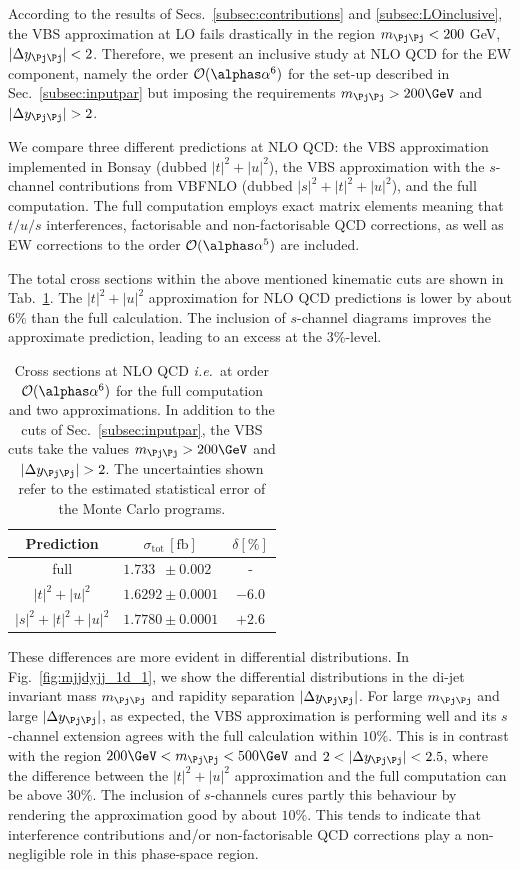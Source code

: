 According to the results of Secs.~\ref{subsec:contributions} and \ref{subsec:LOinclusive}, the VBS approximation at LO fails drastically in the region $m_{\Pj\Pj} < 200$ GeV, $|\Delta y_{\Pj\Pj}| < 2$.
Therefore, we present an inclusive study at NLO QCD for the EW component, namely the order $\mathcal{O}(\alphas\alpha^6)$ for the set-up described in Sec.~\ref{subsec:inputpar} but imposing the requirements $m_{\Pj\Pj}>200 \GeV$ and $|\Delta y_{\Pj\Pj}|>2$.

We compare three different predictions at NLO QCD: 
the VBS approximation implemented in {\sc Bonsay} (dubbed $|t|^2+|u|^2$), the VBS approximation with the $s$-channel contributions from {\sc VBFNLO} (dubbed $|s|^2+|t|^2+|u|^2$), and the full computation.
The full computation employs exact matrix elements meaning that $t/u/s$ interferences, factorisable and non-factorisable QCD corrections, as well as EW corrections to the order $\mathcal{O}(\alphas \alpha^5)$ are included.

The total cross sections within the above mentioned kinematic cuts are shown in Tab.~\ref{tab:crosssecINCLUSIVE}.
The $|t|^2+|u|^2$ approximation for NLO QCD predictions is lower by about $6\%$ than the full calculation.
The inclusion of $s$-channel diagrams improves the approximate prediction, leading to an excess at the $3\%$-level.

\begin{table}[h!]
\centering
\begin{tabular}{c|c|c}
Prediction & $\sigma_{\textrm{tot}}\,[\textrm{fb}]$ & $\delta [\%]$ \\
\hline
\hline
full &  $1.733\phantom{0} \pm 0.002\phantom{0}$ & - \\
\hline
$|t|^2 + |u|^2$ & $1.6292 \pm 0.0001$  &  $-6.0$ \\
\hline
$|s|^2 + |t|^2 + |u|^2$ & $1.7780 \pm 0.0001$  & $+2.6$
\end{tabular}
\caption{Cross sections at NLO QCD \emph{i.e.}\ at order $\mathcal{O}(\alphas\alpha^6)$ for the full computation and two approximations.
In addition to the cuts of Sec.~\ref{subsec:inputpar}, the VBS cuts take the values $m_{\Pj\Pj}>200 \GeV$ and $|\Delta y_{\Pj\Pj}|>2$.
The uncertainties shown refer to the estimated statistical error of the Monte Carlo programs.}
\label{tab:crosssecINCLUSIVE}
\end{table}

These differences are more evident in differential distributions.
In Fig.~\ref{fig:mjjdyjj_1d_1}, we show the differential distributions in the di-jet invariant mass $m_{\Pj\Pj}$ and rapidity separation $|\Delta y_{\Pj\Pj}|$.
For large $m_{\Pj\Pj}$ and large $|\Delta y_{\Pj\Pj}|$, as expected, the VBS approximation is performing well and its $s$-channel extension agrees with the full calculation within $10\%$.
This is in contrast with the region  $200 \GeV < m_{\Pj\Pj} < 500 \GeV$ and $2<|\Delta y_{\Pj\Pj}|<2.5$, where
the difference between the $|t|^2+|u|^2$ approximation and the full computation can be above $30\%$.
The inclusion of $s$-channels cures partly this behaviour by rendering the approximation good by about $10\%$.
This tends to indicate that interference contributions and/or non-factorisable QCD corrections play a non-negligible role in this phase-space region.

